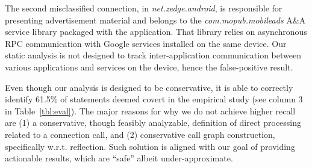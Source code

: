 The second misclassified connection, in \emph{net.zedge.android}, is responsible for presenting advertisement material and belongs to the \emph{com.mopub.mobileads} A\&A service library packaged with the application. 
That library relies on asynchronous RPC communication with Google services 
installed on the same device. Our static analysis is not designed to track inter-application communication between various applications and services on the device, hence the false-positive result.   
 

%

Even though our analysis is designed to be conservative, it is able to correctly identify 
61.5\% of statements deemed covert in the empirical study (see column 3 in Table~\ref{tbl:eval}). 
The major reasons for why we do
not achieve higher recall are (1) a conservative, though feasibly
analyzable, definition of direct processing related to a connection
call, and (2) conservative call graph construction, specifically
w.r.t. reflection.
Such solution is aligned with our goal of providing actionable results, which are ``safe'' albeit under-approximate.
  
